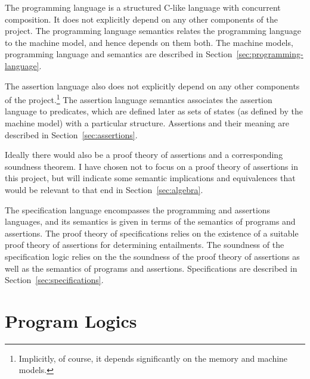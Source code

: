 \documentclass[11pt]{article}
\begin{document}
The programming language is a structured C-like language with concurrent composition. It does not explicitly depend on any other components of the project. The programming language semantics relates the programming language to the machine model, and hence depends on them both. The machine models, programming language and semantics are described in Section~\ref{sec:programming-language}. 

The assertion language also does not explicitly depend on any other components of the project.\footnote{Implicitly, of course, it depends significantly on the memory and machine models.} The assertion language semantics associates the assertion language to predicates, which are defined later as sets of states (as defined by the machine model) with a particular structure. Assertions and their meaning are described in Section~\ref{sec:assertions}. 

Ideally there would also be a proof theory of assertions and a corresponding soundness theorem. I have chosen not to focus on a proof theory of assertions in this project, but will indicate some semantic implications and equivalences that would be relevant to that end in Section~\ref{sec:algebra}.

The specification language encompasses the programming and assertions languages, and its semantics is given in terms of the semantics of programs and assertions. The proof theory of specifications relies on the existence of a suitable proof theory of assertions for determining entailments. The soundness of the specification logic relies on the the soundness of the proof theory of assertions as well as the semantics of programs and assertions. Specifications are described in Section~\ref{sec:specifications}.

\section{Program Logics}
\label{sec:program-logics}
\end{document}
